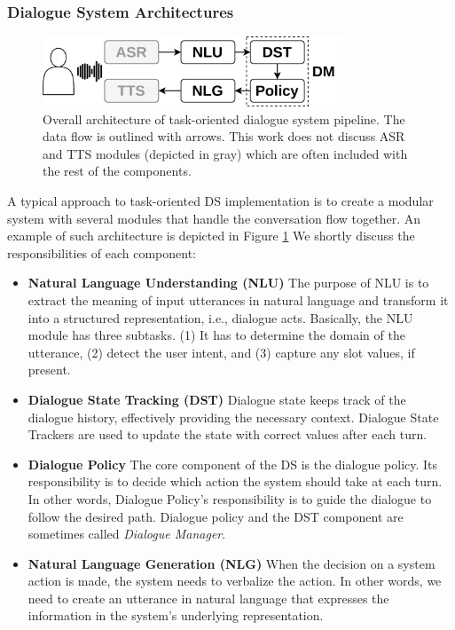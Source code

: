 \subsubsection{Dialogue System Architectures}
\begin{figure}[t]
    \centering
    \includegraphics[width=0.80\textwidth]{images/pipeline.png}
    \caption{Overall architecture of task-oriented dialogue system pipeline. The data flow is outlined with arrows. This work does not discuss ASR and TTS modules (depicted in gray) which are often included with the rest of the components.}
    \label{fig:overall}
\end{figure}
A typical approach to task-oriented DS implementation is to create a modular system with several modules that handle the conversation flow together.
An example of such architecture is depicted in Figure \ref{fig:overall}
We shortly discuss the responsibilities of each component:
\begin{itemize}
    \item \textbf{Natural Language Understanding (NLU)} The purpose of NLU is to extract the meaning of input utterances in natural language and transform it into a structured representation, i.e., dialogue acts.
    Basically, the NLU module has three subtasks.
    (1) It has to determine the domain of the utterance, (2) detect the user intent, and (3) capture any slot values, if present.
    \item \textbf{Dialogue State Tracking (DST)} Dialogue state keeps track of the dialogue history, effectively providing the necessary context.
    Dialogue State Trackers are used to update the state with correct values after each turn.
    \item \textbf{Dialogue Policy} The core component of the DS is the dialogue policy.
    Its responsibility is to decide which action the system should take at each turn.
    In other words, Dialogue Policy's responsibility is to guide the dialogue to follow the desired path.
    Dialogue policy and the DST component are sometimes called \emph{Dialogue Manager}.
    \item \textbf{Natural Language Generation (NLG)} When the decision on a system action is made, the system needs to verbalize the action.
    In other words, we need to create an utterance in natural language that expresses the information in the system's underlying representation.
\end{itemize}

